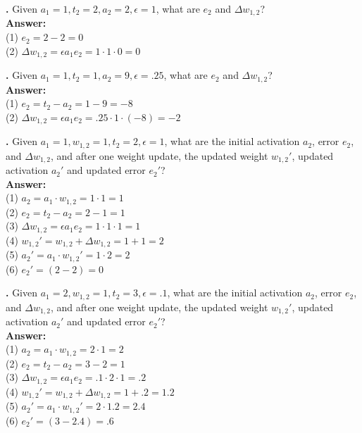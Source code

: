 \noindent
{}
{\bf \theLMSCounter.}  Given $a_1 = 1, t_2 = 2, a_2 = 2, \epsilon = 1$, what are $e_2$ and $\Delta w_{1,2}$? \\
{\bf Answer:}  \\
(1) $e_2 = 2 - 2  = 0 $ \\
(2) $\Delta w_{1,2} = \epsilon a_1 e_2 = 1 \cdot 1 \cdot 0 = 0$
\bigskip

\noindent
{}
{\bf \theLMSCounter.}  Given $a_1 = 1, t_2 = 1, a_2 = 9, \epsilon = .25$, what are $e_2$ and $\Delta w_{1,2}$? \\
{\bf Answer:}  \\
(1) $e_2 = t_2 - a_2 = 1 - 9 = -8 $ \\
(2) $\Delta w_{1,2} = \epsilon a_1 e_2 =  .25 \cdot 1 \cdot (-8)  = -2$
\bigskip





\noindent
{}
{\bf \theLMSCounter.}  Given $a_1 = 1, w_{1,2} = 1, t_2 = 2,\epsilon = 1$, what are the initial activation $a_2$, error $e_2$, and $\Delta w_{1,2}$, and after one weight update, the updated weight $w_{1,2}'$, updated activation  $a_2'$ and updated error $e_2'$? \\
{\bf Answer:}  \\
(1) $a_2 = a_1 \cdot w_{1,2} = 1 \cdot 1 = 1$ \\
(2) $e_2 = t_2 - a_2 = 2 - 1 = 1 $ \\
(3) $\Delta w_{1,2} = \epsilon a_1 e_2 = 1 \cdot 1 \cdot 1 = 1$ \\
(4) $w_{1,2}' = w_{1,2} + \Delta w_{1,2}  = 1 + 1 = 2$\\
(5) $a_2' =  a_1 \cdot w_{1,2}' = 1 \cdot 2 = 2$\\
(6) $e_2' = (2-2) = 0$
\bigskip

\noindent
{}
{\bf \theLMSCounter.}  Given $a_1 = 2, w_{1,2} = 1, t_2 = 3 ,\epsilon = .1$, what are the initial activation $a_2$, error $e_2$, and $\Delta w_{1,2}$, and after one weight update, the updated weight $w_{1,2}'$, updated activation  $a_2'$ and updated error $e_2'$? \\
{\bf Answer:}  \\
(1) $a_2 = a_1 \cdot w_{1,2} = 2 \cdot 1 = 2$ \\
(2) $e_2 = t_2 - a_2 = 3 - 2 = 1 $ \\
(3) $\Delta w_{1,2} = \epsilon a_1 e_2 = .1 \cdot 2 \cdot 1 = .2$ \\
(4) $w_{1,2}' = w_{1,2} + \Delta w_{1,2}  = 1 + .2 = 1.2$\\
(5) $a_2' =  a_1 \cdot w_{1,2}' = 2 \cdot 1.2 = 2.4$\\
(6) $e_2' = (3 - 2.4) = .6$
\bigskip

